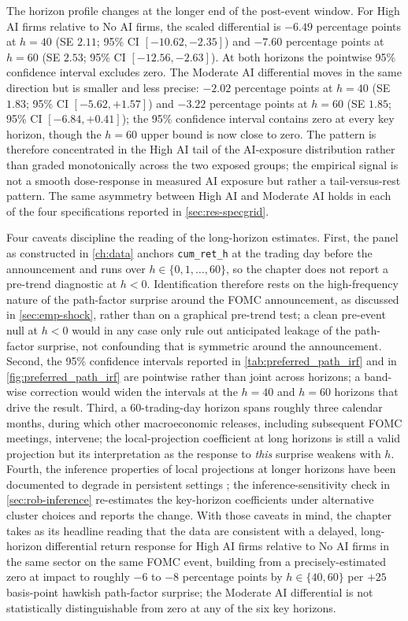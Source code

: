 The horizon profile changes at the longer end of the post-event window.
For High AI firms relative to No AI firms, the scaled differential is
$-6.49$ percentage points at $h = 40$ (SE $2.11$; 95\% CI $[-10.62, -2.35]$)
and $-7.60$ percentage points at $h = 60$ (SE $2.53$; 95\% CI
$[-12.56, -2.63]$). At both horizons the pointwise 95\% confidence
interval excludes zero. The Moderate AI differential moves in the same
direction but is smaller and less precise: $-2.02$ percentage points at
$h = 40$ (SE $1.83$; 95\% CI $[-5.62, +1.57]$) and $-3.22$ percentage
points at $h = 60$ (SE $1.85$; 95\% CI $[-6.84, +0.41]$); the 95\%
confidence interval contains zero at every key horizon, though the
$h = 60$ upper bound is now close to zero. The pattern is therefore concentrated in the High AI tail of the
AI-exposure distribution rather than graded monotonically across the two
exposed groups; the empirical signal is not a smooth dose-response in
measured AI exposure but rather a tail-versus-rest pattern. The same
asymmetry between High AI and Moderate AI holds in each of the four
specifications reported in \cref{sec:res-specgrid}.

Four caveats discipline the reading of the long-horizon estimates.
First, the panel as constructed in \cref{ch:data} anchors
\texttt{cum\_ret\_h} at the trading day before the announcement and runs
over $h \in \{0, 1, \dots, 60\}$, so the chapter does not report a
pre-trend diagnostic at $h < 0$. Identification therefore rests on the
high-frequency nature of the path-factor surprise around the FOMC
announcement, as discussed in \cref{sec:emp-shock}, rather than on a
graphical pre-trend test; a clean pre-event null at $h < 0$ would in any
case only rule out anticipated leakage of the path-factor surprise, not
confounding that is symmetric around the announcement. Second, the 95\%
confidence intervals reported in \cref{tab:preferred_path_irf} and in
\cref{fig:preferred_path_irf} are pointwise rather than joint across
horizons; a band-wise correction would widen the intervals at the
$h = 40$ and $h = 60$ horizons that drive the result. Third, a
60-trading-day horizon spans roughly three calendar months, during which
other macroeconomic releases, including subsequent FOMC meetings,
intervene; the local-projection coefficient at long horizons is still a
valid projection but its interpretation as the response to \emph{this}
surprise weakens with $h$. Fourth, the inference properties of local
projections at longer horizons have been documented to degrade in
persistent settings \citep{olea2024lp}; the inference-sensitivity check
in \cref{sec:rob-inference} re-estimates the key-horizon coefficients
under alternative cluster choices and reports the change. With those
caveats in mind, the chapter takes as its headline reading that the data
are consistent with a delayed, long-horizon differential return response
for High AI firms relative to No AI firms in the same sector on the same
FOMC event, building from a precisely-estimated zero at impact to roughly
$-6$ to $-8$ percentage points by $h \in \{40, 60\}$ per $+25$
basis-point hawkish path-factor surprise; the Moderate AI differential
is not statistically distinguishable from zero at any of the six key
horizons.

